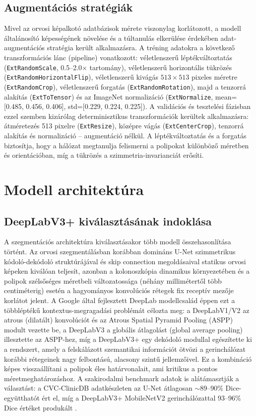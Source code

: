 \documentclass[12pt, a4paper]{report}
\begin{document}
\subsection{Augmentációs stratégiák}
Mivel az orvosi képalkotó adatbázisok mérete viszonylag korlátozott, a modell általánosító képességének növelése és a túltanulás elkerülése érdekében adat-augmentációs stratégia került alkalmazásra. A tréning adatokra a következő transzformációs lánc (pipeline) vonatkozott: véletlenszerű léptékváltoztatás (\texttt{ExtRandomScale}, 0.5--2.0$\times$ tartomány), véletlenszerű horizontális tükrözés (\texttt{ExtRandomHorizontalFlip}), véletlenszerű kivágás $513 \times 513$ pixeles méretre (\texttt{ExtRandomCrop}), véletlenszerű forgatás (\texttt{ExtRandomRotation}), majd a tenzorrá alakítás (\texttt{ExtToTensor}) és az ImageNet normalizáció (\texttt{ExtNormalize}, mean=[0.485, 0.456, 0.406], std=[0.229, 0.224, 0.225]). A validációs és tesztelési fázisban ezzel szemben kizárólag determinisztikus transzformációk kerültek alkalmazásra: átméretezés 513 pixelre (\texttt{ExtResize}), középre vágás (\texttt{ExtCenterCrop}), tenzorrá alakítás és normalizáció -- augmentáció nélkül. A léptékváltoztatás és a forgatás biztosítja, hogy a hálózat megtanulja felismerni a polipokat különböző méretben és orientációban, míg a tükrözés a szimmetria-invarianciát erősíti.

\section{Modell architektúra}

\subsection{DeepLabV3+ kiválasztásának indoklása}
A szegmentációs architektúra kiválasztásakor több modell összehasonlítása történt. Az orvosi szegmentálásban korábban domináns U-Net \cite{unet} szimmetrikus kódoló-dekódoló struktúrájával és skip connection megoldásaival statikus orvosi képeken kiválóan teljesít, azonban a kolonoszkópia dinamikus környezetében és a polipok szélsőséges méretbeli változatossága (néhány millimétertől több centiméterig) esetén a hagyományos konvolúciós rétegek fix receptív mezője korlátot jelent. A Google által fejlesztett DeepLab modellcsalád \cite{deeplabv3plus} éppen ezt a többléptékű kontextus-megragadási problémát célozta meg: a DeepLabV1/V2 az atrous (dilatált) konvolúciót és az Atrous Spatial Pyramid Pooling (ASPP) modult vezette be, a DeepLabV3 a globális átlagolást (global average pooling) illesztette az ASPP-hez, míg a DeepLabV3+ egy dekódoló modullal egészítette ki a rendszert, amely a felskálázott szemantikai információt ötvözi a gerinchálózat korábbi rétegeinek nagy felbontású, alacsony szintű jellemzőivel. Ez a kombináció képes visszaállítani a polipok éles határvonalait, ami kritikus a pontos méretmeghatározáshoz. A szakirodalmi benchmark adatok is alátámasztják a választást: a CVC-ClinicDB adatkészleten az U-Net átlagosan $\sim$89--90\% Dice-együtthatót ért el, míg a DeepLabV3+ MobileNetV2 gerinchálózattal 93--96\% Dice értéket produkált \cite{li_deeplabv3plus}.
\end{document}
